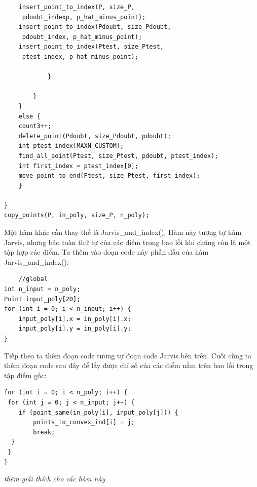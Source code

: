 \documentclass[12pt,a4paper,openany,oneside]{report}
\begin{document}
\begin{lstlisting}
	insert_point_to_index(P, size_P,
	 pdoubt_indexp, p_hat_minus_point);
	insert_point_to_index(Pdoubt, size_Pdoubt,
	 pdoubt_index, p_hat_minus_point);
	insert_point_to_index(Ptest, size_Ptest,
	 ptest_index, p_hat_minus_point);
			
			}
			
		}
	}
	else {
	count3++;
	delete_point(Pdoubt, size_Pdoubt, pdoubt);
	int ptest_index[MAXN_CUSTOM];
	find_all_point(Ptest, size_Ptest, pdoubt, ptest_index);
	int first_index = ptest_index[0];
	move_point_to_end(Ptest, size_Ptest, first_index);
	}
	
}
copy_points(P, in_poly, size_P, n_poly);
\end{lstlisting}

Một hàm khác cần thay thế là Jarvis\_and\_index(). Hàm này tương tự hàm Jarvis, nhưng bảo toàn thứ tự của các điểm trong bao lồi khi chúng còn là một tập hợp các điểm. Ta thêm vào đoạn code này phần đầu của hàm Jarvis\_and\_index():


\begin{lstlisting}
	//global
int n_input = n_poly;
Point input_poly[20];
for (int i = 0; i < n_input; i++) {
	input_poly[i].x = in_poly[i].x;
	input_poly[i].y = in_poly[i].y;
}
\end{lstlisting}
Tiếp theo ta thêm đoạn code tương tự đoạn code Jarvis bên trên. Cuối cùng ta thêm đoạn code sau đây để lấy được chỉ số của các điểm nằm trên bao lồi trong tập điểm gốc:

\begin{lstlisting}
for (int i = 0; i < n_poly; i++) {
 for (int j = 0; j < n_input; j++) {
 	if (point_same(in_poly[i], input_poly[j])) {
		points_to_convex_ind[i] = j;
		break;
  }
 }
}
\end{lstlisting}

\textit{thêm giải thích cho các hàm này}
\end{document}

